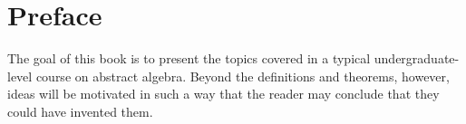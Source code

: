 \section*{Preface}

The goal of this book is to present the topics covered in a typical
undergraduate-level course on abstract algebra. Beyond the definitions and
theorems, however, ideas will be motivated in such a way that the reader may
conclude that they could have invented them.

